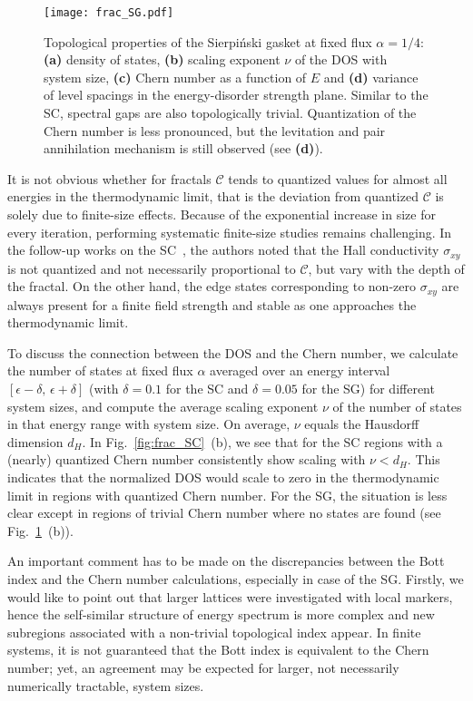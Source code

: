 \begin{figure}[H]
\centering
\texttt{[image: frac\_SG.pdf]} 
\caption[Topological properties of the Sierpiński gasket at fixed flux $\alpha = 1/4$]{Topological properties of the Sierpiński gasket at fixed flux $\alpha = 1/4$: \textbf{(a)} density of states, \textbf{(b)} scaling exponent $\nu$ of the DOS with system size, \textbf{(c)} Chern number as a function of $E$ and \textbf{(d)} variance of level spacings in the energy-disorder strength plane. Similar to the SC, spectral gaps are also topologically trivial. Quantization of the Chern number is less pronounced, but the levitation and pair annihilation mechanism is still observed (see \textbf{(d)}).}
\label{fig:frac_SG}
\end{figure}

It is not obvious whether for fractals $\mathcal{C}$ tends to quantized values for almost all energies in the thermodynamic limit, that is the deviation from quantized $\mathcal{C}$ is solely due to finite-size effects. Because of the exponential increase in size for every iteration, performing systematic finite-size studies remains challenging. In the follow-up works on the SC~\cite{EdgesFremling2020, KatnelsonFractal2020}, the authors noted that the Hall conductivity $\sigma_{xy}$ is not quantized and not necessarily proportional to $\mathcal{C}$, but vary with the depth of the fractal. On the other hand, the edge states corresponding to non-zero $\sigma_{xy}$ are always present for a finite field strength and stable as one approaches the thermodynamic limit.

To discuss the connection between the DOS and the Chern number, we calculate the number of states at fixed flux $\alpha$ averaged over an energy interval $[\epsilon - \delta,\, \epsilon + \delta]$ (with $\delta = 0.1$ for the SC and $\delta = 0.05$ for the SG) for different system sizes, and compute the average scaling exponent $\nu$ of the number of states in that energy range with system size. On average, $\nu$ equals the Hausdorff dimension $d_{H}$. In Fig.~\ref{fig:frac_SC}~(b), we see that for the SC regions with a (nearly) quantized Chern number consistently show scaling with $\nu < d_{H}$. This indicates that the normalized DOS would scale to zero in the thermodynamic limit in regions with quantized Chern number. For the SG, the situation is less clear except in regions of trivial Chern number where no states are found (see Fig.~\ref{fig:frac_SG}~(b)). 

An important comment has to be made on the discrepancies between the Bott index and the Chern number calculations, especially in case of the SG. Firstly, we would like to point out that larger lattices were investigated with local markers, hence the self-similar structure of energy spectrum is more complex and new subregions associated with a non-trivial topological index appear. In finite systems, it is not guaranteed that the Bott index is equivalent to the Chern number; yet, an agreement may be expected for larger, not necessarily numerically tractable, system sizes.

